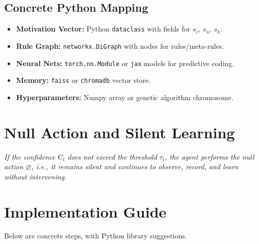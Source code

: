 \documentclass[11pt]{article}
\begin{document}
\subsection{Concrete Python Mapping}
\begin{itemize}
  \item \textbf{Motivation Vector:} Python \texttt{dataclass} with fields for $s_c$, $s_u$, $s_h$.
  \item \textbf{Rule Graph:} \texttt{networkx.DiGraph} with nodes for rules/meta-rules.
  \item \textbf{Neural Nets:} \texttt{torch.nn.Module} or \texttt{jax} models for predictive coding.
  \item \textbf{Memory:} \texttt{faiss} or \texttt{chromadb} vector store.
  \item \textbf{Hyperparameters:} Numpy array or genetic algorithm chromosome.
\end{itemize}

\section{Null Action and Silent Learning}
\textit{If the confidence $C_t$ does not exceed the threshold $\tau_t$, the agent performs the null action $\varnothing$, i.e., it remains silent and continues to observe, record, and learn without intervening.}

\section{Implementation Guide}

Below are concrete steps, with Python library suggestions.
\end{document}

